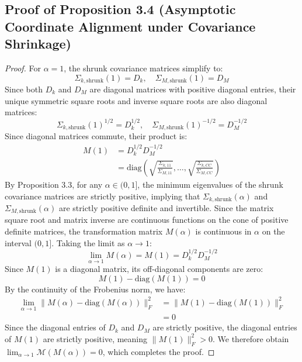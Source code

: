 \documentclass{article}
\theoremstyle{plain}
\theoremstyle{definition}
\theoremstyle{remark}
\begin{document}
\subsection{Proof of Proposition 3.4 (Asymptotic Coordinate Alignment under Covariance Shrinkage)}
\label{sec:proofs_asymptotic_alignment}
\begin{proof}
For $\alpha = 1$, the shrunk covariance matrices simplify to:
\begin{equation*}
  \Sigma_{k,\text{shrunk}}(1) = D_k, \quad \Sigma_{M,\text{shrunk}}(1) = D_M
\end{equation*}
Since both $D_k$ and $D_M$ are diagonal matrices with positive diagonal entries, their unique symmetric square roots and inverse square roots are also diagonal matrices:
\begin{equation*}
  \Sigma_{k,\text{shrunk}}(1)^{1/2} = D_k^{1/2}, \quad \Sigma_{M,\text{shrunk}}(1)^{-1/2} = D_M^{-1/2}
\end{equation*}
Since diagonal matrices commute, their product is:
\begin{align*}
  M(1) &= D_k^{1/2} D_M^{-1/2} \\
  &= \text{diag}\left( \sqrt{\frac{\Sigma_{k,11}}{\Sigma_{M,11}}}, \dots, \sqrt{\frac{\Sigma_{k,CC}}{\Sigma_{M,CC}}} \right)
\end{align*}
By Proposition 3.3, for any $\alpha \in (0, 1]$, the minimum eigenvalues of the shrunk covariance matrices are strictly positive, implying that $\Sigma_{k,\text{shrunk}}(\alpha)$ and $\Sigma_{M,\text{shrunk}}(\alpha)$ are strictly positive definite and invertible. Since the matrix square root and matrix inverse are continuous functions on the cone of positive definite matrices, the transformation matrix $M(\alpha)$ is continuous in $\alpha$ on the interval $(0, 1]$. Taking the limit as $\alpha \to 1$:
\begin{equation*}
  \lim_{\alpha \to 1} M(\alpha) = M(1) = D_k^{1/2} D_M^{-1/2}
\end{equation*}
Since $M(1)$ is a diagonal matrix, its off-diagonal components are zero:
\begin{equation*}
  M(1) - \text{diag}(M(1)) = 0
\end{equation*}
By the continuity of the Frobenius norm, we have:
\begin{align*}
  \lim_{\alpha \to 1} \big\| M(\alpha) - \text{diag}(M(\alpha)) \big\|_F^2 &= \big\| M(1) - \text{diag}(M(1)) \big\|_F^2 \\
  &= 0
\end{align*}
Since the diagonal entries of $D_k$ and $D_M$ are strictly positive, the diagonal entries of $M(1)$ are strictly positive, meaning $\|M(1)\|_F^2 > 0$. We therefore obtain $\lim_{\alpha \to 1} \mathcal{M}(M(\alpha)) = 0$, which completes the proof.
\end{proof}
\end{document}
